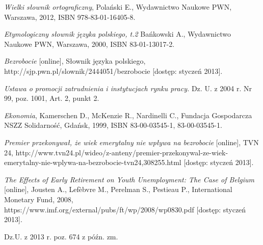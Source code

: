\documentclass[12pt]{article}
\begin{document}
\begin{thebibliography}{9}
 \small
 
  \emph{Wielki słownik ortograficzny},
  Polański E.,
  Wydawnictwo Naukowe PWN,
  Warszawa,
  2012,
  ISBN 978-83-01-16405-8.
 
  \emph{Etymologiczny słownik języka polskiego, t.2}
  Bańkowski A.,
  Wydawnictwo Naukowe PWN,
  Warszawa,
  2000,
  ISBN 83-01-13017-2.
 
  \emph{Bezrobocie} [online],
  Słownik języka polskiego,
  http://sjp.pwn.pl/slownik/2444051/bezrobocie [dostęp: styczeń 2013].
 
 \emph{Ustawa o promocji zatrudnienia i instytucjach rynku pracy.}
 Dz. U. z 2004 r. Nr 99, poz. 1001, Art. 2, punkt 2.
 
  \emph{Ekonomia},
  Kamerschen D., McKenzie R., Nardinelli C.,
  Fundacja Gospodarcza NSZZ Solidarność,
  Gdańsk,
  1999,
  ISBN 83-00-03545-1, 83-00-03545-1.
  
  \emph{Premier przekonywał, że wiek emerytalny nie wpływa na bezrobocie} [online],
  TVN 24,
  http://www.tvn24.pl/wideo/z-anteny/premier-przekonywal-ze-wiek-emerytalny-nie-wplywa-na-bezrobocie-tvn24,308255.html [dostęp: styczeń 2013].
 
  \emph{The Effects of Early Retirement on Youth Unemployment: The Case of Belgium} [online],
  Jousten A., Lefèbvre M., Perelman S., Pestieau P.,
  International Monetary Fund,
  2008,
  https://www.imf.org/external/pubs/ft/wp/2008/wp0830.pdf  [dostęp: styczeń 2013].
 
  Dz.U. z 2013 r. poz. 674 z późn. zm.
  
\end{thebibliography}
    
\end{document}
